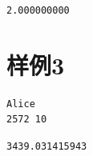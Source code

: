 \documentclass[11pt, a4paper]{article}
\begin{document}
\begin{Verbatim}[frame=single, label=output]
2.000000000

\end{Verbatim}

\section*{样例3}
\begin{Verbatim}[frame=single, label=input]
Alice
2572 10

\end{Verbatim}

\begin{Verbatim}[frame=single, label=output]
3439.031415943

\end{Verbatim}
\end{document}
